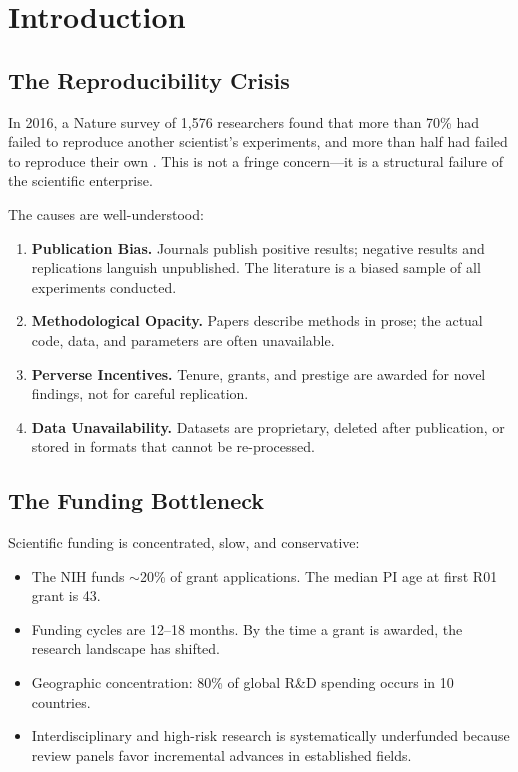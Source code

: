 \section{Introduction}

\label{sec:intro}

\subsection{The Reproducibility Crisis}

In 2016, a Nature survey of 1,576 researchers found that more than 70\% had failed to reproduce another scientist's experiments, and more than half had failed to reproduce their own \cite{baker2016reproducibility}. This is not a fringe concern---it is a structural failure of the scientific enterprise.

The causes are well-understood:

\begin{enumerate}
    \item \textbf{Publication Bias.} Journals publish positive results; negative results and replications languish unpublished. The literature is a biased sample of all experiments conducted.
    \item \textbf{Methodological Opacity.} Papers describe methods in prose; the actual code, data, and parameters are often unavailable.
    \item \textbf{Perverse Incentives.} Tenure, grants, and prestige are awarded for novel findings, not for careful replication.
    \item \textbf{Data Unavailability.} Datasets are proprietary, deleted after publication, or stored in formats that cannot be re-processed.
\end{enumerate}

\subsection{The Funding Bottleneck}

Scientific funding is concentrated, slow, and conservative:

\begin{itemize}
    \item The NIH funds $\sim$20\% of grant applications. The median PI age at first R01 grant is 43.
    \item Funding cycles are 12--18 months. By the time a grant is awarded, the research landscape has shifted.
    \item Geographic concentration: 80\% of global R\&D spending occurs in 10 countries.
    \item Interdisciplinary and high-risk research is systematically underfunded because review panels favor incremental advances in established fields.
\end{itemize}

